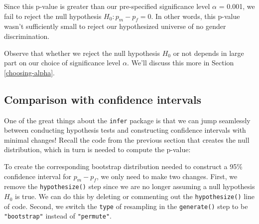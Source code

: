 \documentclass[
]{book}
\newenvironment{Shaded}{\begin{snugshade}}{\end{snugshade}}
\newcommand{\DataTypeTok}[1]{\textcolor[rgb]{0.13,0.29,0.53}{#1}}
\newcommand{\DecValTok}[1]{\textcolor[rgb]{0.00,0.00,0.81}{#1}}
\newcommand{\KeywordTok}[1]{\textcolor[rgb]{0.13,0.29,0.53}{\textbf{#1}}}
\newcommand{\NormalTok}[1]{#1}
\newcommand{\OperatorTok}[1]{\textcolor[rgb]{0.81,0.36,0.00}{\textbf{#1}}}
\newcommand{\StringTok}[1]{\textcolor[rgb]{0.31,0.60,0.02}{#1}}
\begin{document}
Since this p-value is greater than our pre-specified significance level \(\alpha\) = 0.001, we fail to reject the null hypothesis \(H_0: p_{m} - p_{f} = 0\). In other words, this p-value wasn't sufficiently small to reject our hypothesized universe of no gender discrimination.

Observe that whether we reject the null hypothesis \(H_0\) or not depends in large part on our choice of significance level \(\alpha\). We'll discuss this more in Section \ref{choosing-alpha}.

\hypertarget{comparing-infer-workflows}{%
\subsection{Comparison with confidence intervals}\label{comparing-infer-workflows}}

One of the great things about the \texttt{infer} package is that we can jump seamlessly between conducting hypothesis tests and constructing confidence intervals with minimal changes! Recall the code from the previous section that creates the null distribution, which in turn is needed to compute the p-value:

\begin{Shaded}
\end{Shaded}

To create the corresponding bootstrap distribution needed to construct a 95\% confidence interval for \(p_{m} - p_{f}\), we only need to make two changes.  First, we remove the \texttt{hypothesize()} step since we are no longer assuming a null hypothesis \(H_0\) is true. We can do this by deleting or commenting out the \texttt{hypothesize()} line of code. Second, we switch the \texttt{type} of resampling in the \texttt{generate()} step to be \texttt{"bootstrap"} instead of \texttt{"permute"}.
\end{document}
